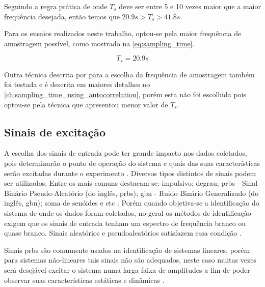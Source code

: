 Seguindo a regra prática de  onde $T_s$ deve ser entre 5 e 10 vezes maior que a
maior frequência desejada, então temos que $20.9s > T_s > 41.8s$.

Para os ensaios realizados neste trabalho, optou-se pela maior frequência de amostragem possível, como
mostrado na \cref{eq:sampling_time}.

\begin{equation}
	\label{eq:sampling_time}
	T_s = 20.9s
\end{equation}

Outra técnica descrita por  para a escolha da frequência de amostragem
também foi testada e é descrita em maiores detalhes no \cref{ch:sampling_time_using_autocorrelation},
porém esta não foi escolhida pois optou-se pela técnica que apresentou menor valor de $T_s$.

\subsection{Sinais de excitação}
\label{subsec:sinais_de_excitacao}

A escolha dos sinais de entrada pode ter grande impacto nos dados coletados,
pois determinarão o ponto de operação do sistema e quais das suas características serão excitadas
durante o experimento \cite{Aguirre2015}.
Diversos tipos distintos de sinais podem ser utilizados. Entre os mais comuns destacam-se:
impulsivo; degrau; \acrshort{prbs} - Sinal Binário Pseudo-Aleatório (do inglês, \acrlong{prbs});
\acrshort{gbn} - Ruido Binário Generalizado (do inglês, \acrlong{gbn}); soma de senóides e etc \cite{Aguirre2015}.
Porém quando objetiva-se a identificação do sistema de onde os dados foram coletados, no geral
os métodos de identificação exigem que os sinais de entrada tenham um espectro de frequência
branco ou quase branco. Sinais aleatórios e pseudoaleatórios satisfazem essa condição \cite{Aguirre2015}.

Sinais \acrshort{prbs} são comumente usados na identificação de sistemas lineares, porém para sistemas
não-lineares tais sinais não são adequados, neste caso muitas vezes será desejável excitar o
sistema numa larga faixa de amplitudes a fim de poder observar suas características estáticas e dinâmicas
\cite{Aguirre2015}.

